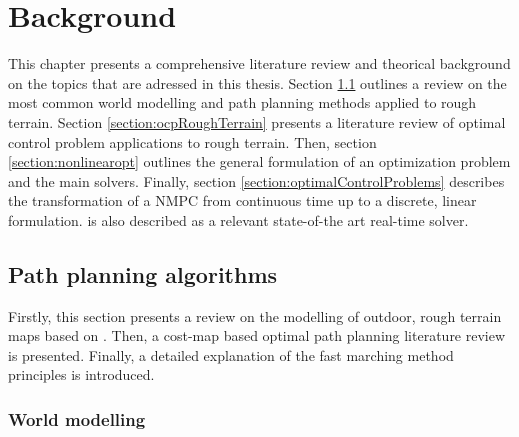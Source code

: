 
\chapter{Background}
\label{chapter:stateArt}

This chapter presents a comprehensive literature review and theorical background on the topics that are adressed in this thesis. Section \ref{section:pathPlanningAlgorithms} outlines a review on the most common world modelling and path planning methods applied to rough terrain. Section \ref{section:ocpRoughTerrain} presents a literature review of optimal control problem applications to rough terrain. Then, section \ref{section:nonlinearopt} outlines the general formulation of an optimization problem and the main solvers. Finally, section \ref{section:optimalControlProblems} describes the transformation of a NMPC from continuous time up to a discrete, linear formulation.  is also described as a relevant state-of-the art real-time solver.

\section{Path planning algorithms}
\label{section:pathPlanningAlgorithms}

Firstly, this section presents a review on the modelling of outdoor, rough terrain maps based on \cite{chapter45handbookrobotics}. Then, a cost-map based optimal path planning literature review is presented. Finally, a detailed explanation of the fast marching method principles is introduced.

\subsection{World modelling}
\label{subsection:worldModelling}

